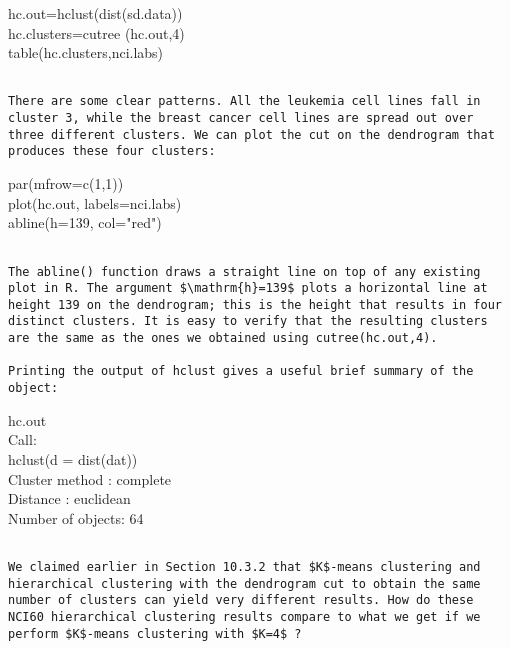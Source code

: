 \documentclass[10pt]{article}
\begin{document}
\begin{displayquote}
hc.out=hclust(dist(sd.data))\\
hc.clusters=cutree (hc.out,4)\\
table(hc.clusters,nci.labs)
\end{displayquote}

\begin{verbatim}

There are some clear patterns. All the leukemia cell lines fall in cluster 3, while the breast cancer cell lines are spread out over three different clusters. We can plot the cut on the dendrogram that produces these four clusters:
\end{verbatim}

\begin{displayquote}
par(mfrow=c(1,1))\\
plot(hc.out, labels=nci.labs)\\
abline(h=139, col="red")
\end{displayquote}

\begin{verbatim}

The abline() function draws a straight line on top of any existing plot in R. The argument $\mathrm{h}=139$ plots a horizontal line at height 139 on the dendrogram; this is the height that results in four distinct clusters. It is easy to verify that the resulting clusters are the same as the ones we obtained using cutree(hc.out,4).

Printing the output of hclust gives a useful brief summary of the object:
\end{verbatim}

\begin{displayquote}
hc.out\\
Call:\\
hclust(d = dist(dat))\\
Cluster method : complete\\
Distance : euclidean\\
Number of objects: 64
\end{displayquote}

\begin{verbatim}

We claimed earlier in Section 10.3.2 that $K$-means clustering and hierarchical clustering with the dendrogram cut to obtain the same number of clusters can yield very different results. How do these NCI60 hierarchical clustering results compare to what we get if we perform $K$-means clustering with $K=4$ ?
\end{verbatim}
\end{document}
